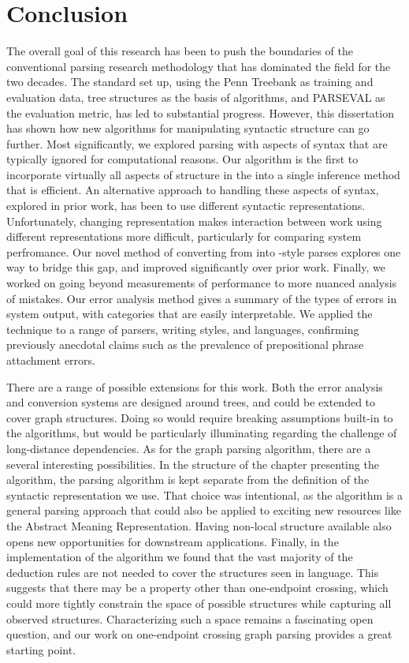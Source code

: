 \chapter{Conclusion}

The overall goal of this research has been to push the boundaries of the conventional parsing research methodology that has dominated the field for the two decades.
The standard set up, using the Penn Treebank as training and evaluation data, tree structures as the basis of algorithms, and PARSEVAL as the evaluation metric, has led to substantial progress.
However, this dissertation has shown how new algorithms for manipulating syntactic structure can go further.
Most significantly, we explored parsing with aspects of syntax that are typically ignored for computational reasons.
Our algorithm is the first to incorporate virtually all aspects of structure in the \ptb into a single inference method that is efficient.
An alternative approach to handling these aspects of syntax, explored in prior work, has been to use different syntactic representations.
Unfortunately, changing representation makes interaction between work using different representations more difficult, particularly for comparing system perfromance.
Our novel method of converting from \ccg into \ptb-style parses explores one way to bridge this gap, and improved significantly over prior work.
Finally, we worked on going beyond measurements of performance to more nuanced analysis of mistakes.
Our error analysis method gives a summary of the types of errors in system output, with categories that are easily interpretable.
We applied the technique to a range of parsers, writing styles, and languages, confirming previously anecdotal claims such as the prevalence of prepositional phrase attachment errors.

There are a range of possible extensions for this work.
Both the error analysis and conversion systems are designed around trees, and could be extended to cover graph structures.
Doing so would require breaking assumptions built-in to the algorithms, but would be particularly illuminating regarding the challenge of long-distance dependencies.
As for the graph parsing algorithm, there are a several interesting possibilities.
In the structure of the chapter presenting the algorithm, the parsing algorithm is kept separate from the definition of the syntactic representation we use.
That choice was intentional, as the algorithm is a general parsing approach that could also be applied to exciting new resources like the Abstract Meaning Representation.
Having non-local structure available also opens new opportunities for downstream applications.
Finally, in the implementation of the algorithm we found that the vast majority of the deduction rules are not needed to cover the structures seen in language.
This suggests that there may be a property other than one-endpoint crossing, which could more tightly constrain the space of possible structures while capturing all observed structures.
Characterizing such a space remains a fascinating open question, and our work on one-endpoint crossing graph parsing provides a great starting point.

